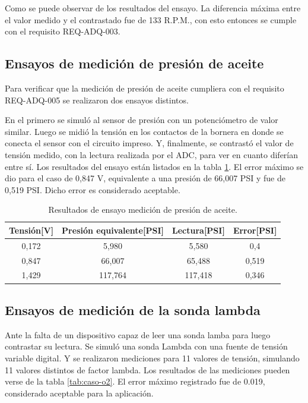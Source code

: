 Como se puede observar de los resultados del ensayo. La diferencia máxima entre el valor medido y el contrastado fue de 133 R.P.M., con esto entonces se cumple con el requisito REQ-ADQ-003.

\break

\subsection{Ensayos de medición de presión de aceite}

Para verificar que la medición de presión de aceite cumpliera con el requisito REQ-ADQ-005 se realizaron dos ensayos distintos.

En el primero se simuló al sensor de presión con un potenciómetro de valor similar. Luego se midió la tensión en los contactos de la bornera en donde se conecta el sensor con el circuito impreso. Y, finalmente, se contrastó el valor de tensión medido, con la lectura realizada por el ADC, para ver en cuanto diferían entre sí. Los resultados del ensayo están listados en la tabla \ref{tab:ensayo-presion}. El error máximo se dio para el caso de 0,847 V, equivalente a una presión de 66,007 PSI y fue de 0,519 PSI. Dicho error es considerado aceptable. 

\begin{table}[htpb]
	\centering
	\caption{Resultados de ensayo medición de presión de aceite.}
	\centering
	\begin{tabular}{c c c c}    
		\toprule
		\textbf{Tensión[V]} & \textbf{Presión equivalente[PSI]} & \textbf{Lectura[PSI]} & \textbf{Error[PSI]}\\
		\midrule
		0,172		&   5,980 & 5,580 & 0,4 \\
		0,847		&   66,007 & 65,488 & 0,519 \\
		1,429		&   117,764 & 117,418 & 0,346 \\
		\bottomrule
	\end{tabular}
	\label{tab:ensayo-presion}
\end{table}

\subsection{Ensayos de medición de la sonda lambda}

Ante la falta de un dispositivo capaz de leer una sonda lamba para luego contrastar su lectura. Se simuló una sonda Lambda con una fuente de tensión variable digital. Y se realizaron mediciones para 11 valores de tensión, simulando 11 valores distintos de factor lambda. Los resultados de las mediciones pueden verse de la tabla \ref{tab:caso-o2}. El error máximo registrado fue de 0.019, considerado aceptable para la aplicación.

